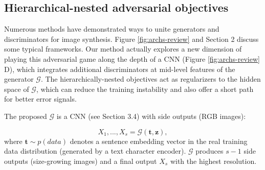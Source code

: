 \documentclass[10pt,twocolumn,letterpaper]{article}
\begin{document}
\subsection{Hierarchical-nested adversarial objectives}
Numerous methods have demonstrated ways to unite generators and discriminators for image synthesis. Figure \ref{fig:archs-review} and Section 2 discuss some typical frameworks.
Our method actually explores a new dimension of playing this adversarial game along the depth of a CNN (Figure \ref{fig:archs-review} D), which integrates additional discriminators at mid-level features of the generator $\mathcal{G}$. 
The hierarchically-nested objectives 
act as regularizers to the hidden space of $\mathcal{G}$, which can reduce the training instability and also offer a short path for better error signals.

The proposed $\mathcal{G}$ is a CNN (see Section 3.4) with side outputs (RGB images):

\begin{equation}
\label{side}
X_1,..., X_s = \mathcal{G}(\bm t, \bm z), 
\end{equation}
where  $\bm t\sim p(data)$ denotes a sentence embedding vector in the real training data distribution (generated by a text character encoder). $\mathcal{G}$ produces $s-1$ side outputs (size-growing images) and a final output $X_s$ with the highest resolution.

\end{document}
